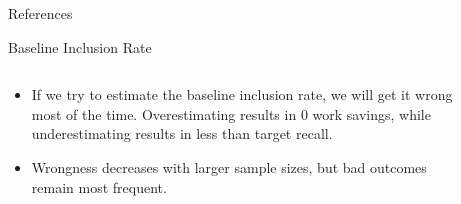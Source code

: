\documentclass[9pt,aspectratio=169]{beamer}
\begin{document}
\begin{frame}{References}



\end{frame}
		

\begin{frame}{Baseline Inclusion Rate}

\begin{columns}
	\begin{column}{0.618\linewidth}
		\begin{itemize}
			\item<1-> If we try to estimate the baseline inclusion rate, we will get it wrong most of the time. Overestimating results in 0 work savings, while underestimating results in less than target recall.
			\item<2-> Wrongness decreases with larger sample sizes, but bad outcomes remain most frequent.
		\end{itemize}
	\end{column}
	\begin{column}{0.382\linewidth}
		\begin{figure}
			

\end{figure}
\end{column}
\end{columns}
\end{frame}
\end{document}
